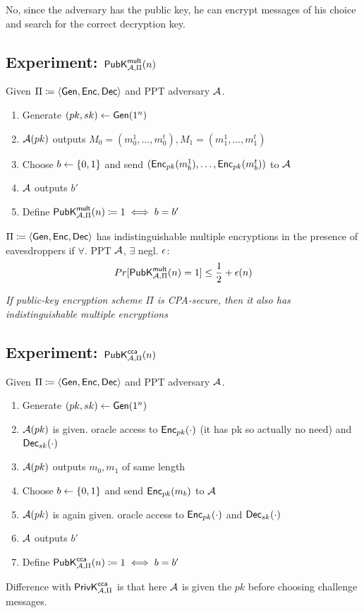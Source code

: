 \documentclass[12pt]{article}
\begin{document}
No, since the adversary has the public key, he can encrypt messages of his choice and search for the correct decryption key.
\newpage

\subsection{Experiment: $\mathsf{PubK}_{\mathcal{A},\Pi}^\mathsf{mult}(n)$}
Given $\Pi \coloneqq \langle \operatorname{\mathsf{Gen}}, \operatorname{\mathsf{Enc}}, \operatorname{\mathsf{Dec}} \rangle$ and PPT adversary $\mathcal{A}$.

\begin{enumerate}
	\item Generate $(pk,sk) \leftarrow \operatorname{\mathsf{Gen}}(1^n)$
	\item $\mathcal{A}(pk)$ outputs $M_0 = (m_0^1,\dots,m_0^t), M_1=(m_1^1,\dots,m_1^t)$ 
	\item Choose $b\leftarrow \{0, 1\}$ and send $(\operatorname{\mathsf{Enc}}_{pk}(m_b^1),\dots,\operatorname{\mathsf{Enc}}_{pk}(m_b^t))$ to $\mathcal{A}$
	\item $\mathcal{A}$ outputs $b'$
	\item Define $\mathsf{PubK}_{\mathcal{A},\Pi}^\mathsf{mult}(n)\coloneqq 1 \iff b=b'$
\end{enumerate}

$\Pi \coloneqq \langle \operatorname{\mathsf{Gen}}, \operatorname{\mathsf{Enc}}, \operatorname{\mathsf{Dec}} \rangle$ has indistinguishable multiple encryptions in the presence of eavesdroppers if $\forall$. PPT $\mathcal{A}$, $\exists$ negl. $\epsilon$:
\begin{equation*}
Pr[\mathsf{PubK}_{\mathcal{A},\Pi}^\mathsf{mult}(n)=1] \le \frac12 + \epsilon(n)
\end{equation*}

\emph{If public-key encryption scheme $\Pi$ is CPA-secure, then it also has indistinguishable multiple encryptions}

\subsection{Experiment: $\mathsf{PubK}_{\mathcal{A},\Pi}^\mathsf{cca}(n)$}
Given $\Pi \coloneqq \langle \operatorname{\mathsf{Gen}}, \operatorname{\mathsf{Enc}}, \operatorname{\mathsf{Dec}} \rangle$ and PPT adversary $\mathcal{A}$.
\begin{enumerate}
\item Generate $(pk,sk) \leftarrow \operatorname{\mathsf{Gen}}(1^n)$
\item $\mathcal{A}(pk)$ is given. oracle access to $\operatorname{\mathsf{Enc}}_{pk}(\cdot)$ (it has pk so actually no need) and $\operatorname{\mathsf{Dec}}_{sk}(\cdot)$
\item $\mathcal{A}(pk)$ outputs $m_0, m_1$ of same length
\item Choose $b\leftarrow \{0, 1\}$ and send $\operatorname{\mathsf{Enc}}_{pk}(m_b)$ to $\mathcal{A}$
\item $\mathcal{A}(pk)$ is again given. oracle access to $\operatorname{\mathsf{Enc}}_{pk}(\cdot)$ and $\operatorname{\mathsf{Dec}}_{sk}(\cdot)$
\item $\mathcal{A}$ outputs $b'$
\item Define $\mathsf{PubK}_{\mathcal{A},\Pi}^\mathsf{cca}(n)\coloneqq 1 \iff b=b'$
\end{enumerate}
Difference with $\mathsf{PrivK}_{\mathcal{A},\Pi}^\mathsf{cca}$ is that here $\mathcal{A}$ is given the $pk$ before choosing challenge messages.
\end{document}
